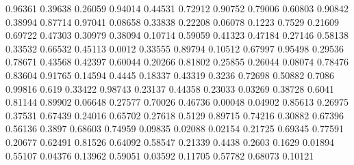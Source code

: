 \documentclass{article}
\newenvironment{eulernotebook}{\par}{\par}
\newenvironment{eulercomment}{\par\medskip}{\par\medskip}
\begin{document}
\begin{eulernotebook}
\begin{eulercomment}
\begin{eulercomment}
\begin{eulercomment}
\begin{eulercomment}
\begin{eulercomment}
\begin{eulercomment}
\begin{euleroutput}
              0.96361
              0.39638
              0.26059
              0.94014
              0.44531
              0.72912
              0.90752
              0.79006
              0.60803
              0.90842
              0.38994
              0.87714
              0.97041
              0.08658
              0.33838
              0.22208
              0.06078
               0.1223
               0.7529
              0.21609
              0.69722
              0.47303
              0.30979
              0.38094
              0.10714
              0.59059
              0.41323
              0.47184
              0.27146
              0.58138
              0.33532
              0.66532
              0.45113
               0.0012
              0.33555
              0.89794
              0.10512
              0.67997
              0.95498
              0.29536
              0.78671
              0.43568
              0.42397
              0.60044
              0.20266
              0.81802
              0.25855
              0.26044
              0.08074
              0.78476
              0.83604
              0.91765
              0.14594
               0.4445
              0.18337
              0.43319
               0.3236
              0.72698
              0.50882
               0.7086
              0.99816
                0.619
              0.33422
              0.98743
              0.23137
              0.44358
              0.23033
              0.03269
              0.38728
               0.6041
              0.81144
              0.89902
              0.06648
              0.27577
              0.70026
              0.46736
              0.00048
              0.04902
              0.85613
              0.26975
              0.37531
              0.67439
              0.24016
              0.65702
              0.27618
               0.5129
              0.89715
              0.74216
              0.30882
              0.67396
              0.56136
               0.3897
              0.68603
              0.74959
              0.09835
              0.02088
              0.02154
              0.21725
              0.69345
              0.77591
              0.20677
              0.62491
              0.81526
              0.64092
              0.58547
              0.21339
               0.4438
               0.2603
               0.1629
              0.01894
              0.55107
              0.04376
              0.13962
              0.59051
              0.03592
              0.11705
              0.57782
              0.68073
              0.10121

\end{euleroutput}
\end{eulercomment}
\end{eulercomment}
\end{eulercomment}
\end{eulercomment}
\end{eulercomment}
\end{eulercomment}
\end{eulernotebook}
\end{document}
